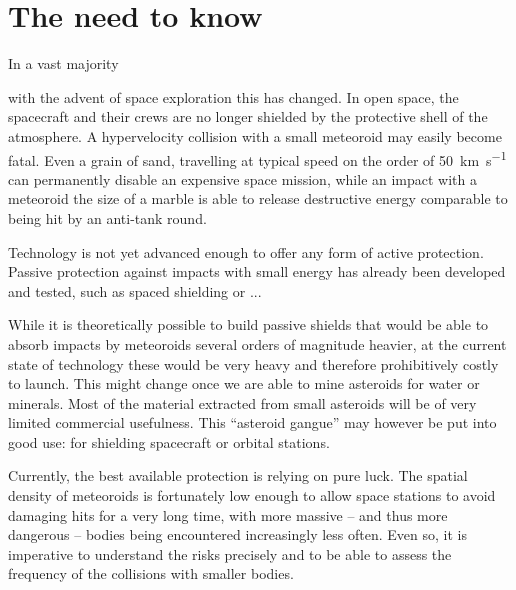 

\section{The need to know}
    In a vast majority

    with the advent of space exploration this has changed. In open space, the spacecraft and their crews are no longer shielded
    by the protective shell of the atmosphere. A hypervelocity collision with a small meteoroid may easily become fatal.
    Even a grain of sand, travelling at typical speed on the order of \SI{50}{\kilo\metre\per\second} can permanently disable
    an expensive space mission, while an impact with a meteoroid the size of a marble is able to release
    destructive energy comparable to being hit by an anti-tank round.

    Technology is not yet advanced enough to offer any form of active protection.
    Passive protection against impacts with small energy has already been developed and tested,
    such as spaced shielding \cite{...} or ...

    While it is theoretically possible to build passive shields that would be able to absorb impacts
    by meteoroids several orders of magnitude heavier, at the current state of technology these would
    be very heavy and therefore prohibitively costly to launch.
    This might change once we are able to mine asteroids for water or minerals.
    Most of the material extracted from small asteroids will be of very limited commercial usefulness.
    This ``asteroid gangue'' may however be put into good use: for shielding spacecraft or orbital stations.

    Currently, the best available protection is relying on pure luck. The spatial density of meteoroids is
    fortunately low enough to allow space stations to avoid damaging hits for a very long time,
    with more massive -- and thus more dangerous -- bodies being encountered increasingly less often.
    Even so, it is imperative to understand the risks precisely and to be able to assess the frequency
    of the collisions with smaller bodies.

